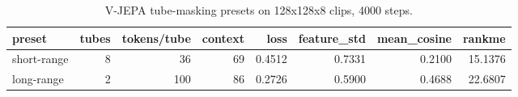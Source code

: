 \begin{table}[t]
\centering
\begin{tabular}{lrrrrrrr}
\toprule
preset & tubes & tokens/tube & context & loss & feature\_std & mean\_cosine & rankme \\
\midrule
short-range & 8 & 36 & 69 & 0.4512 & 0.7331 & 0.2100 & 15.1376 \\
long-range & 2 & 100 & 86 & 0.2726 & 0.5900 & 0.4688 & 22.6807 \\
\bottomrule
\end{tabular}
\caption{V-JEPA tube-masking presets on 128x128x8 clips, 4000 steps.}
\label{tab:vjepa}
\end{table}
